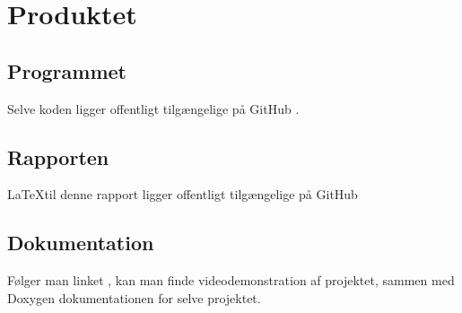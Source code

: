 \chapter{Produktet}
\label{chapter:produktet}

\section{Programmet}
\label{sec:the-program}
Selve koden ligger offentligt tilgængelige på GitHub \cite{the-project}.



\section{Rapporten}
\label{sec:the-report}
\LaTeX til denne rapport ligger offentligt tilgængelige på GitHub \cite{the-report}

\section{Dokumentation}
\label{sec:the-documentation}
Følger man linket \cite{the-auxiliary}, kan man finde videodemonstration af projektet, sammen med Doxygen dokumentationen for selve projektet. 
